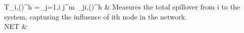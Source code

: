 \documentclass[
  number]{elsarticle}
\begin{document}
\begin{longtable}[]
                                                                                                                                                                                                                                                                                                                                                                                                                                                                                                                                                                                                                                                                                                                                                                                                                                                                                                                                                                                                                                                                                                              T_{\cdot \leftarrow i,(\tau)}^h =\sum_{j=1,i \ne j}^m \theta_{j\leftarrow i,(\tau)}^h                                                                                                                                                     
                                                                                                                                                                                                                                                                                                                                                                                                                                                                                                                                                                                                                                                                                                                                                                                                                                                                                                                                                                                                                                                                                                              \)
& Measures the total spillover from i to the system, capturing the
influence of ith node in the network. \\
NET &

\end{longtable}
\end{document}
